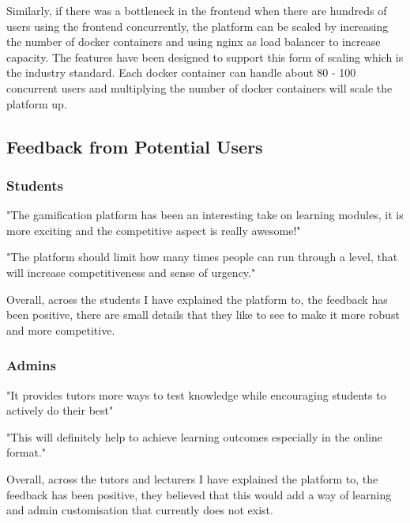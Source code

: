 Similarly, if there was a bottleneck in the frontend when there are hundreds of users using the frontend concurrently, the platform can be scaled by increasing the number of docker containers and using nginx as load balancer to increase capacity. The features have been designed to support this form of scaling which is the industry standard. Each docker container can handle about 80 - 100 concurrent users and multiplying the number of docker containers will scale the platform up.

\subsection{Feedback from Potential Users}
\subsubsection{Students}

"The gamification platform has been an interesting take on learning modules, it is more exciting and the competitive aspect is really awesome!"

"The platform should limit how many times people can run through a level, that will increase competitiveness and sense of urgency."

Overall, across the students I have explained the platform to, the feedback has been positive, there are small details that they like to see to make it more robust and more competitive.

\subsubsection{Admins}

"It provides tutors more ways to test knowledge while encouraging students to actively do their best"

"This will definitely help to achieve learning outcomes especially in the online format."

Overall, across the tutors and lecturers I have explained the platform to, the feedback has been positive, they believed that this would add a way of learning and admin customisation that currently does not exist.

\newpage